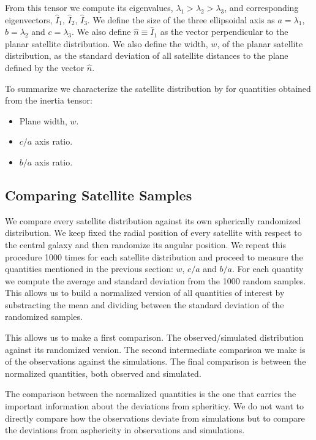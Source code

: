 \documentclass[a4paper,fleqn,usenatbib]{mnras}
\begin{document}
From this tensor we compute its eigenvalues,
$\lambda_1>\lambda_2>\lambda_3$, and corresponding eigenvectors,
$\hat{I}_1$, $\hat{I}_2$, $\hat{I}_3$.
We define the size of the three ellipsoidal axis as
$a=\lambda_1$, $b=\lambda_2$ and $c=\lambda_3$.
We also define $\hat{n}\equiv \hat{I}_1$ as the vector perpendicular to the
planar satellite distribution. 
We also define the width, $w$, of the planar satellite distribution,
as the standard deviation of all satellite distances to the plane
defined by the vector $\hat{n}$.  

To summarize we characterize the satellite distribution by for
quantities obtained from the inertia tensor: 
\begin{itemize}
\item Plane width, $w$.
\item $c/a$ axis ratio.
\item $b/a$ axis ratio.
\end{itemize}


\subsection{Comparing Satellite Samples}

We compare every satellite distribution against its own spherically
randomized distribution.
We keep fixed the radial position of every satellite
with respect to the central galaxy and then randomize its angular
position. 
We repeat this procedure 1000 times for each satellite distribution
and proceed to measure the quantities mentioned in the previous section:
$w$, $c/a$ and $b/a$.
For each quantity we compute the average and standard deviation from
the 1000 random samples. 
This allows us to build a normalized version of all quantities of
interest by substracting the mean and dividing between the standard
deviation of the randomized samples.

This allows us to make a first comparison. 
The observed/simulated
distribution against its randomized version. 
The second intermediate comparison we make is of the observations against
the simulations.
The final comparison is between the normalized quantities, both
observed and simulated.

The comparison between the normalized quantities is the one that
carries the important information about the deviations from
spheriticy. 
We do not want to directly compare how the observations
deviate from simulations but to compare the deviations from
asphericity in observations and simulations. 
\end{document}
